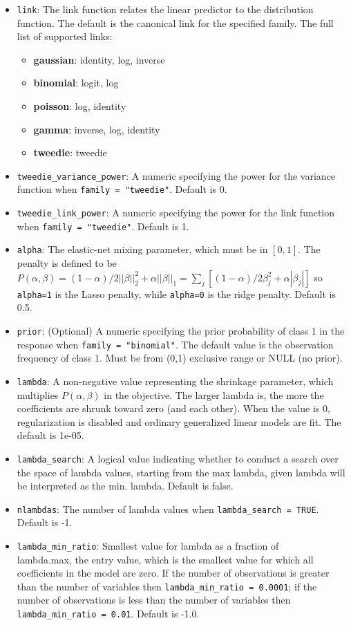 \begin{itemize}
\item \texttt{link}: The link function relates the linear predictor to the distribution function. The default is the canonical link for the specified family. The full list of supported links: 
	\begin{itemize}
\item	{\textbf {gaussian}}: identity, log, inverse 
\item {\textbf{binomial}}: logit, log 
\item {\textbf{poisson}}: log, identity
\item {\textbf{gamma}}: inverse, log, identity
\item {\textbf{tweedie}}: tweedie 
	\end{itemize}
\item \texttt{tweedie\_variance\_power}: A numeric specifying the power for the variance function when \texttt{family = "tweedie"}.  Default is 0.
\item \texttt{tweedie\_link\_power}: A numeric specifying the power for the link function when \texttt{family = "tweedie"}.  Default is 1.
\item \texttt{alpha}: The elastic-net mixing parameter, which must be in $[0,1]$. The penalty is defined to be $P(\alpha,\beta) = (1-\alpha)/2||\beta||_2^2 + \alpha||\beta||_1 = \sum_j [(1-\alpha)/2 \beta_j^2 + \alpha|\beta_j|] $ so \texttt{alpha=1} is the Lasso penalty, while \texttt{alpha=0} is the ridge penalty. Default is 0.5.
\item \texttt{prior}: (Optional) A numeric specifying the prior probability of class 1 in the response when \texttt{family = "binomial"}. The default value is the observation frequency of class 1. Must be from (0,1) exclusive range or NULL (no prior).
\item \texttt{lambda}: A non-negative value representing the shrinkage parameter, which multiplies $P(\alpha,\beta)$ in the objective. The larger lambda is, the more the coefficients are shrunk toward zero (and each other). When the value is 0, regularization is disabled and ordinary generalized linear models are fit. The default is 1e-05.
\item \texttt{lambda\_search}: A logical value indicating whether to conduct a search over the space of lambda values, starting from the max lambda, given lambda will be interpreted as the min. lambda. Default is false.
\item \texttt{nlambdas}: The number of lambda values when \texttt{lambda\_search = TRUE}. Default is -1.
\item \texttt{lambda\_min\_ratio}: Smallest value for lambda as a fraction of \\ lambda.max, the entry value, which is the smallest value for which all coefficients in the model are zero. If the number of observations is greater than the number of variables then \texttt{lambda\_min\_ratio = 0.0001}; if the number of observations is less than the number of variables then \texttt{lambda\_min\_ratio = 0.01}. Default is -1.0.

\end{itemize}
